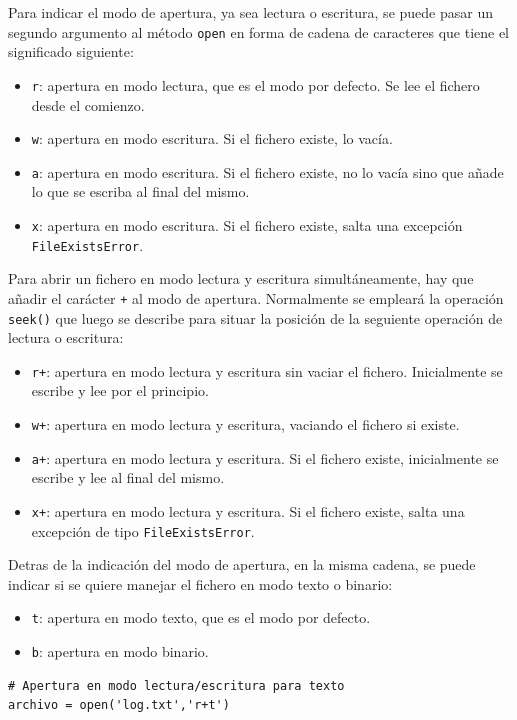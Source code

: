 Para indicar el modo de apertura, ya sea lectura o escritura, se puede pasar un segundo argumento al método \texttt{open} en forma de cadena de caracteres que tiene el significado siguiente:
\begin{itemize}
	\item \texttt{r}: apertura en modo lectura, que es el modo por defecto. Se lee el fichero desde el comienzo.
	\item \texttt{w}: apertura en modo escritura. Si el fichero existe, lo vacía.
	\item \texttt{a}: apertura en modo escritura. Si el fichero existe, no lo vacía sino que añade lo que se escriba al final del mismo.
	\item \texttt{x}: apertura en modo escritura. Si el fichero existe, salta una excepción \texttt{FileExistsError}.
\end{itemize}

Para abrir un fichero en modo lectura y escritura simultáneamente, hay que añadir el carácter \texttt{+} al modo de apertura. Normalmente se empleará la operación \texttt{seek()} que luego se describe para situar la posición de la seguiente operación de lectura o escritura:
\begin{itemize}
	\item \texttt{r+}: apertura en modo lectura y escritura sin vaciar el fichero. Inicialmente se escribe y lee por el principio.
	\item \texttt{w+}: apertura en modo lectura y escritura, vaciando el fichero si existe.
	\item \texttt{a+}: apertura en modo lectura y escritura. Si el fichero existe, inicialmente se escribe y lee al final del mismo.
	\item \texttt{x+}: apertura en modo lectura y escritura. Si el fichero existe, salta una excepción de tipo \texttt{FileExistsError}.
\end{itemize}

Detras de la indicación del modo de apertura, en la misma cadena, se puede indicar si se quiere manejar el fichero en modo texto o binario:
\begin{itemize}
	\item \texttt{t}: apertura en modo texto, que es el modo por defecto.
	\item \texttt{b}: apertura en modo binario.
\end{itemize}

\begin{lstlisting}
# Apertura en modo lectura/escritura para texto
archivo = open('log.txt','r+t')
\end{lstlisting}

